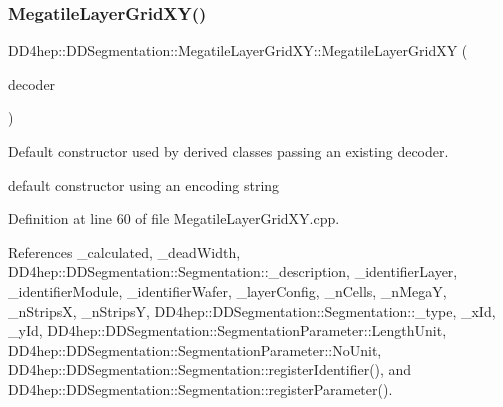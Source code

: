 \hypertarget{class_d_d4hep_1_1_d_d_segmentation_1_1_megatile_layer_grid_x_y_ad60883ac07ec3cec93063cab4d79a76d}{}\label{class_d_d4hep_1_1_d_d_segmentation_1_1_megatile_layer_grid_x_y_ad60883ac07ec3cec93063cab4d79a76d} 
\subsubsection{\texorpdfstring{Megatile\+Layer\+Grid\+X\+Y()}{MegatileLayerGridXY()}\hspace{0.1cm}{\footnotesize\ttfamily [2/2]}}
{\footnotesize\ttfamily D\+D4hep\+::\+D\+D\+Segmentation\+::\+Megatile\+Layer\+Grid\+X\+Y\+::\+Megatile\+Layer\+Grid\+XY (\begin{DoxyParamCaption}\item[{\hyperlink{class_d_d4hep_1_1_d_d_segmentation_1_1_bit_field64}{Bit\+Field64} $\ast$}]{decoder }\end{DoxyParamCaption})}



Default constructor used by derived classes passing an existing decoder. 

default constructor using an encoding string 

Definition at line 60 of file Megatile\+Layer\+Grid\+X\+Y.\+cpp.



References \+\_\+calculated, \+\_\+dead\+Width, D\+D4hep\+::\+D\+D\+Segmentation\+::\+Segmentation\+::\+\_\+description, \+\_\+identifier\+Layer, \+\_\+identifier\+Module, \+\_\+identifier\+Wafer, \+\_\+layer\+Config, \+\_\+n\+Cells, \+\_\+n\+MegaY, \+\_\+n\+StripsX, \+\_\+n\+StripsY, D\+D4hep\+::\+D\+D\+Segmentation\+::\+Segmentation\+::\+\_\+type, \+\_\+x\+Id, \+\_\+y\+Id, D\+D4hep\+::\+D\+D\+Segmentation\+::\+Segmentation\+Parameter\+::\+Length\+Unit, D\+D4hep\+::\+D\+D\+Segmentation\+::\+Segmentation\+Parameter\+::\+No\+Unit, D\+D4hep\+::\+D\+D\+Segmentation\+::\+Segmentation\+::register\+Identifier(), and D\+D4hep\+::\+D\+D\+Segmentation\+::\+Segmentation\+::register\+Parameter().

\hypertarget{class_d_d4hep_1_1_d_d_segmentation_1_1_megatile_layer_grid_x_y_a3ba425f7256a951d0d5b451261023009}{}\label{class_d_d4hep_1_1_d_d_segmentation_1_1_megatile_layer_grid_x_y_a3ba425f7256a951d0d5b451261023009} 
